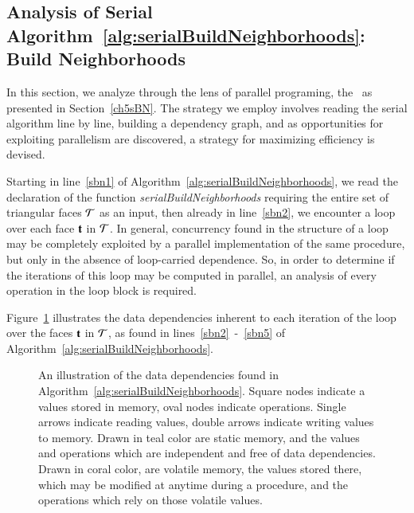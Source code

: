 %
%
\subsection{Analysis of Serial Algorithm~\ref{alg:serialBuildNeighborhoods}: Build Neighborhoods}
\label{ch6sBNPssASABN}
In this section, we analyze through the lens of parallel programing, the~ as presented in Section~\ref{ch5sBN}. The strategy we employ involves reading the serial algorithm line by line, building a dependency graph, and as opportunities for exploiting parallelism are discovered, a strategy for maximizing efficiency is devised.

Starting in line~\ref{sbn1} of Algorithm~\ref{alg:serialBuildNeighborhoods}, we read the declaration of the function \textit{serialBuildNeighborhoods} requiring the entire set of triangular faces $\mathcal{T}$ as an input, then already in line~\ref{sbn2}, we encounter a loop over each face $\mathbf{t}$ in $\mathcal{T}$. In general, concurrency found in the structure of a loop may be completely exploited by a parallel implementation of the same procedure, but only in the absence of loop-carried dependence. So, in order to determine if the iterations of this loop may be computed in parallel, an analysis of every operation in the loop block is required.

Figure~\ref{fig:sabnDataDependencies} illustrates the data dependencies inherent to each iteration of the loop over the faces $\mathbf{t}$ in $\mathcal{T}$, as found in lines~\ref{sbn2}~-~\ref{sbn5} of Algorithm~\ref{alg:serialBuildNeighborhoods}.


\begin{figure}[ht]
	
	{\caption[Data Dependencies in Serial Algorithm~\ref{alg:serialBuildNeighborhoods}: Build Neighborhoods]{An illustration of the data dependencies found in Algorithm~\ref{alg:serialBuildNeighborhoods}. Square nodes indicate a values stored in memory, oval nodes indicate operations. Single arrows indicate reading values, double arrows indicate writing values to memory. Drawn in teal color are static memory, and the values and operations which are independent and free of data dependencies. Drawn in coral color, are volatile memory, the values stored there, which may be modified at anytime during a procedure, and the operations which rely on those volatile values.}\label{fig:sabnDataDependencies}}
\end{figure}

